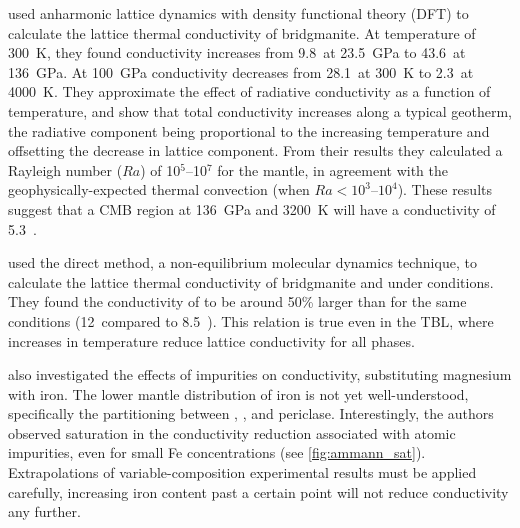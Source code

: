 \citet{Dekura2013} used \ais anharmonic lattice dynamics with density functional theory (DFT) to calculate the lattice thermal conductivity of bridgmanite. At temperature of 300~K, they found conductivity increases from 9.8~\wmks at 23.5~GPa to 43.6~\wmks at 136~GPa. At 100~GPa conductivity decreases from 28.1~\wmks at 300~K to 2.3~\wmks at 4000~K. They approximate the effect of radiative conductivity as a function of temperature, and show that total conductivity increases along a typical geotherm, the radiative component being proportional to the increasing temperature and offsetting the decrease in lattice component. From their results they calculated a Rayleigh number ($Ra$) of 10$^5$--10$^7$ for the mantle, in agreement with the geophysically-expected thermal convection (when $Ra < 10^3$--$10^4$). These results suggest that a CMB region at 136~GPa and 3200~K will have a conductivity of 5.3~\wmk.%

\citet{Ammann2014} used the direct method, a non-equilibrium molecular dynamics technique, to calculate the lattice thermal conductivity of bridgmanite and \ppvs under \ddds conditions. They found the conductivity of \ppvs to be around 50\% larger than \bdg for the same conditions (12~\wmks compared to 8.5~\wmk). This relation is true even in the TBL, where increases in temperature reduce lattice conductivity for all \mgsios phases. %

\citet{Ammann2014} also investigated the effects of impurities on conductivity, substituting magnesium with iron. The lower mantle distribution of iron is not yet well-understood, specifically the partitioning between \bdg, \ppv, and periclase. Interestingly, the authors observed saturation in the conductivity reduction associated with atomic impurities, even for small Fe concentrations (see \ref{fig:ammann_sat}). Extrapolations of variable-composition experimental results must be applied carefully, increasing iron content past a certain point will not reduce conductivity any further.

